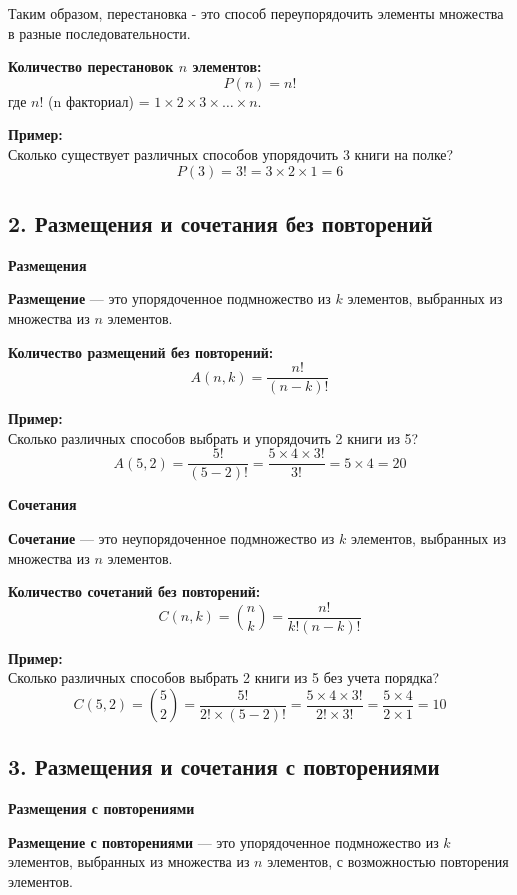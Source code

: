 \documentclass{article}
\begin{document}
Таким образом, перестановка - это способ переупорядочить элементы множества в разные последовательности.

\textbf{Количество перестановок \( n \) элементов:}
\[
P(n)=n!
\]
где \( n! \) (n факториал) = \( 1 \times 2 \times 3 \times \ldots \times n \).

\textbf{Пример:} \\
Сколько существует различных способов упорядочить 3 книги на полке?
\[
P(3) = 3! = 3 \times 2 \times 1 = 6
\]
\pagebreak

\subsection*{2. Размещения и сочетания без повторений}

\textbf{Размещения}

\textbf{Размещение} — это упорядоченное подмножество из \( k \) элементов, выбранных из множества из \( n \) элементов.

\textbf{Количество размещений без повторений:}
\[
A(n, k) = \frac{n!}{(n - k)!}
\]

\textbf{Пример:} \\
Сколько различных способов выбрать и упорядочить 2 книги из 5?
\[
A(5, 2) = \frac{5!}{(5 - 2)!} = \frac{5 \times 4 \times 3!}{3!} = 5 \times 4 = 20
\]

\textbf{Сочетания}

\textbf{Сочетание} — это неупорядоченное подмножество из \( k \) элементов, выбранных из множества из \( n \) элементов.

\textbf{Количество сочетаний без повторений:}
\[
C(n, k) = \binom{n}{k} = \frac{n!}{k! (n - k)!}
\]

\textbf{Пример:} \\
Сколько различных способов выбрать 2 книги из 5 без учета порядка?
\[
C(5, 2) = \binom{5}{2} = \frac{5!}{2! \times (5 - 2)!} = \frac{5 \times 4 \times 3!}{2! \times 3!} = \frac{5 \times 4}{2 \times 1} = 10
\]
\pagebreak

\subsection*{3. Размещения и сочетания с повторениями}

\textbf{Размещения с повторениями}

\textbf{Размещение с повторениями} — это упорядоченное подмножество из \( k \) элементов, выбранных из множества из \( n \) элементов, с возможностью повторения элементов.
\end{document}

